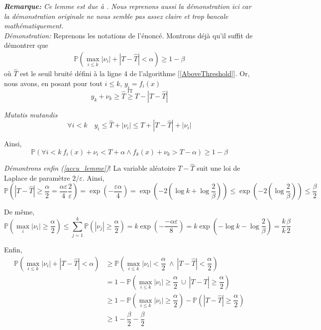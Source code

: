 \textit{\textbf{Remarque:} Ce lemme est due à \cite[page 61]{dwork2014the}. Nous reprenons aussi la démonstration ici car la démonstration originale ne nous semble pas assez claire et trop bancale mathématiquement.}\\

\textit{Démonstration:} Reprenons les notations de l'énoncé. Montrons déjà qu'il suffit de démontrer que 
\begin{align}
    \label{accu_lemme}
    \mathbb P\left( \max_{i \leq k} |\nu_i| + |T - \hat T| < \alpha  \right)  \geq 1 - \beta   
\end{align}
où \(\hat T\) est le seuil bruité défini à la ligne 4 de l'algorithme [\ref{AboveThreshold}]. Or, nous avons, en posant pour tout \(i \leq k\), \(y_i = f_i(x)\)
\[
    y_k + \nu_k \geq \hat T \overset{\text{IT}}{\geq} T - |T-\hat T|
\]

\textit{Mutatis mutandis} 
\[
    \forall i < k \quad y_i \leq \hat T + |\nu_i| \leq T + |T - \hat T| + |\nu_i|  
\]

Ainsi,
\[
    \mathbb P \left( \forall i < k \  f_i(x) + \nu_i < T + \alpha \wedge f_k(x) + \nu_k > T - \alpha \right) \geq 1 - \beta
\]

\textit{Démontrons enfin (\ref{accu_lemme})}! La variable aléatoire \(T-\hat T\) suit une loi de {\sc Laplace} de paramètre \(2/\varepsilon\). Ainsi,
\[
    \mathbb P \left( |T - \hat T| \geq \dfrac{\alpha}{2} = \dfrac{\alpha \varepsilon}{4}\dfrac{2}{\varepsilon} \right) = \exp\left( -\dfrac{\varepsilon \alpha}{4} \right) = \exp\left( -2\left( \log k + \log \dfrac{2}{\beta} \right) \right) \leq \exp\left( -2\left(\log \dfrac{2}{\beta} \right) \right) \leq \dfrac{\beta}{2}
\]

De même,
\[
    \mathbb P \left( \max_{i} |\nu_i| \geq \dfrac{\alpha}{2} \right) \leq \sum\limits_{j = 1}^k \mathbb P \left( |\nu_j| \geq \dfrac{\alpha}{2} \right) = k \exp\left( -\dfrac{-\alpha\varepsilon}{8} \right) = k \exp\left( -\log k - \log\dfrac{2}{\beta} \right) = \dfrac{k}{k} \dfrac{\beta}{2}
\]

Enfin, 
\begin{align*}
    \mathbb P\left( \max_{i \leq k} |\nu_i| + |T - \hat T| < \alpha  \right) & \geq \mathbb P\left( \max_{i \leq k} |\nu_i| < \dfrac{\alpha}{2} \ \wedge \ |T - \hat T| < \dfrac{\alpha}{2} \right)\\
    & = 1 - \mathbb P\left( \max_{i \leq k} |\nu_i| \geq \dfrac{\alpha}{2} \ \cup \ |T - \hat T| \geq \dfrac{\alpha}{2} \right)\\
    & \geq 1 - \mathbb P\left( \max_{i \leq k} |\nu_i| \geq \dfrac{\alpha}{2}\right) - \mathbb P \left(|T - \hat T| \geq \dfrac{\alpha}{2} \right)\\
    &\geq 1 - \dfrac{\beta}{2} - \dfrac{\beta}{2}
\end{align*}

